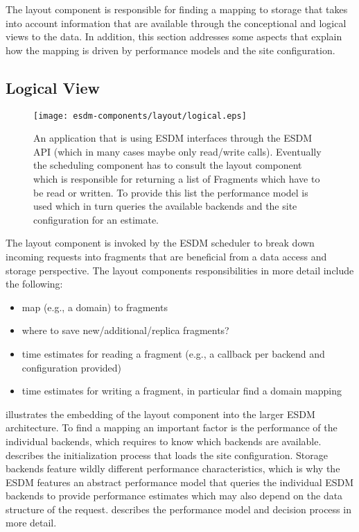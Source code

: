 
The layout component is responsible for finding a mapping to storage that takes into account information that are available through the conceptional and logical views to the data.
In addition, this section addresses some aspects that explain how the mapping is driven by performance models and the site configuration.


\subsection{Logical View}

\begin{figure}
	\centering
	\texttt{[image: esdm-components/layout/logical.eps]}
	\caption{An application that is using ESDM interfaces through the ESDM API (which in many cases maybe only read/write calls). Eventually the scheduling component has to consult the layout component which is responsible for returning a list of Fragments which have to be read or written. To provide this list the performance model is used which in turn queries the available backends and the site configuration for an estimate.}
	\label{fig:esdm layout logical view}
\end{figure}

The layout component is invoked by the ESDM scheduler to break down incoming requests into fragments that are beneficial from a data access and storage perspective.
The layout components responsibilities in more detail include the following:

\begin{itemize}
	\item map (e.g., a domain) to fragments
	\item where to save new/additional/replica fragments?
	\item time estimates for reading a fragment (e.g., a callback per backend and configuration provided)
	\item time estimates for writing a fragment, in particular find a domain mapping
\end{itemize}

 illustrates the embedding of the layout component into the larger ESDM architecture.
To find a mapping an important factor is the performance of the individual backends, which requires to know which backends are available.
 describes the initialization process that loads the site configuration.
Storage backends feature wildly different performance characteristics, which is why the ESDM features an abstract performance model that queries the individual ESDM backends to provide performance estimates which may also depend on the data structure of the request.
 describes the performance model and decision process in more detail.

